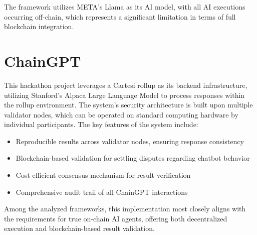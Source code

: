 \documentclass[fleqn,10pt]{olplainarticle}
\begin{document}
The framework utilizes META's Llama as its AI model, with all AI executions occurring off-chain, which represents a significant limitation in terms of full blockchain integration.


\section{ChainGPT}
This hackathon project leverages a Cartesi rollup as its backend infrastructure, utilizing Stanford's Alpaca Large Language Model to process responses within the rollup environment. The system's security architecture is built upon multiple validator nodes, which can be operated on standard computing hardware by individual participants.
The key features of the system include:
\begin{itemize}[noitemsep]
	\item Reproducible results across validator nodes, ensuring response consistency
	\item Blockchain-based validation for settling disputes regarding chatbot behavior
	\item Cost-efficient consensus mechanism for result verification
	\item Comprehensive audit trail of all ChainGPT interactions
\end{itemize}

Among the analyzed frameworks, this implementation most closely aligns with the requirements for true on-chain AI agents, offering both decentralized execution and blockchain-based result validation.
\end{document}
